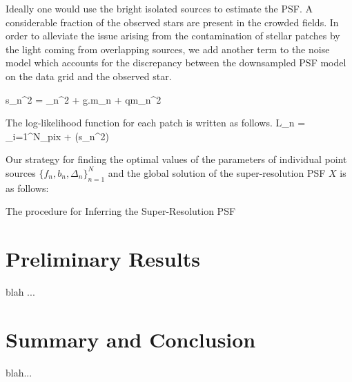 Ideally one would use the bright isolated sources to estimate the PSF. A considerable fraction of the observed stars are present in the crowded fields. 
In order to alleviate the issue arising from the contamination of stellar patches by the light coming from overlapping sources, we add another term to the noise model which accounts for the discrepancy between the downsampled PSF model on the data grid and the observed star. 

\beq
s_n^2 = \sigma_{n}^{2} + g.m_{n} + qm_{n}^{2}
\eeq 


The log-likelihood function for each patch is written as follows. 
 \ln L_{n} = \sum_{i=1}^{N_{\rm pix}}  + \ln(s_{n}^{2})
\eeq

Our strategy for finding the optimal values of the parameters of individual point sources $\{f_{n},b_{n},\Delta_{n}\}_{n=1}^{N}$ and the global solution of the
super-resolution PSF $X$ is as follows:

\begin{algorithm} 
\caption{The procedure for Inferring the Super-Resolution PSF}
\begin{algorithmic}[1] \label{alg:abcpmc}
   \STATE // \emph{This can now be done in parallel for all i}
   \STATE $b_{n}$ \gets {} \; $(y_{n})$
   \STATE $f_{n}$ \gets $\sum_{i=1}^{N_pix} \big(y_{n,i} - b_{n}\big)$
   \STATE {} $\Delta_{n}$ with the 3 polynomial method
   \STATE $X_{n}$ \gets {} $(\Delta_n)[\big(y_{n,i} - b_{n}\big)/f_n]$
\ENDFOR
\STATE $X$ \gets $\sum_{n=1}^{N} X_{n]$
\ENDIF
\IF{$t=2,...,N_{it}:$}
\FOR{$i=1,...,N$}
   \STATE // \emph{This loop can now be done in parallel for all i}
   \WHILE{$\rho(X,D)>\epsilon_t$}
   \STATE Draw $\pars^{*}_{t}$ from $\{\pars_{t-1}\}$ with probabilities $\{w_{t-1}\}$
   \STATE $\pars^{*}_{t} \gets K(\pars^{*}_{t},.)$
   \STATE $X = f(\pars^{*}_{t})$
   \ENDWHILE
   \STATE $\pars^{(i)}_{t} \gets \pars^{*}_{t}$
   \STATE $w^{(i)}_{t} \gets \pi(\pars^{(i)}_{t}) / \big(\sum\limits_{j=1}^{N}w_{t-1}^{(i)}K(\pars^{(j)}_{t-1},\pars^{(i)}_{t}) \big)$
\ENDFOR
\ENDIF
\end{algorithmic}
\end{algorithm}

\section{Preliminary Results}\label{sec:results}

blah ...

\section{Summary and Conclusion}\label{sec:summary}

blah...
